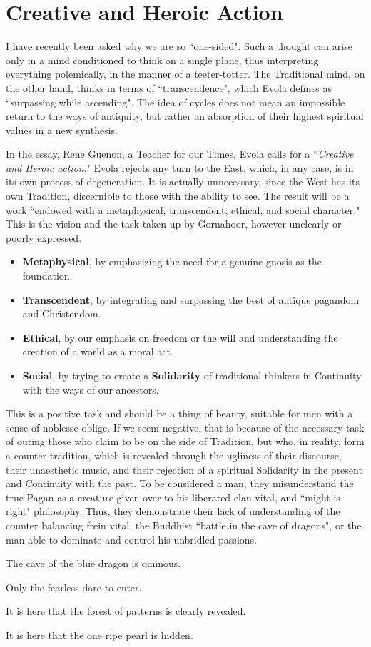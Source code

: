 \section{Creative and Heroic Action}

I have recently been asked why we are so ``one-sided". Such a thought can arise only in a mind conditioned to think on a single plane, thus interpreting everything polemically, in the manner of a teeter-totter. The Traditional mind, on the other hand, thinks in terms of ``transcendence", which Evola defines as ``surpassing while ascending". The idea of cycles does not mean an impossible return to the ways of antiquity, but rather an absorption of their highest spiritual values in a new synthesis.

In the essay, Rene Guenon, a Teacher for our Times, Evola calls for a ``\emph{Creative and Heroic action}." Evola rejects any turn to the East, which, in any case, is in its own process of degeneration. It is actually unnecessary, since the West has its own Tradition, discernible to those with the ability to see. The result will be a work ``endowed with a metaphysical, transcendent, ethical, and social character." This is the vision and the task taken up by Gornahoor, however unclearly or poorly expressed.

\begin{itemize}
\item \textbf{Metaphysical}, by emphasizing the need for a genuine gnosis as the foundation. 
\item \textbf{Transcendent}, by integrating and surpassing the best of antique pagandom and Christendom. 
\item \textbf{Ethical}, by our emphasis on freedom or the will and understanding the creation of a world as a moral act. 
\item \textbf{Social}, by trying to create a \textbf{Solidarity} of traditional thinkers in Continuity with the ways of our ancestors. 
\end{itemize}
This is a positive task and should be a thing of beauty, suitable for men with a sense of noblesse oblige. If we seem negative, that is because of the necessary task of outing those who claim to be on the side of Tradition, but who, in reality, form a counter-tradition, which is revealed through the ugliness of their discourse, their unaesthetic music, and their rejection of a spiritual Solidarity in the present and Continuity with the past. To be considered a man, they misunderstand the true Pagan as a creature given over to his liberated elan vital, and ``might is right" philosophy. Thus, they demonstrate their lack of understanding of the counter balancing frein vital, the Buddhist ``battle in the cave of dragons", or the man able to dominate and control his unbridled passions.


\hfill

The cave of the blue dragon is ominous.

Only the fearless dare to enter.

It is here that the forest of patterns is clearly revealed.

It is here that the one ripe pearl is hidden.



